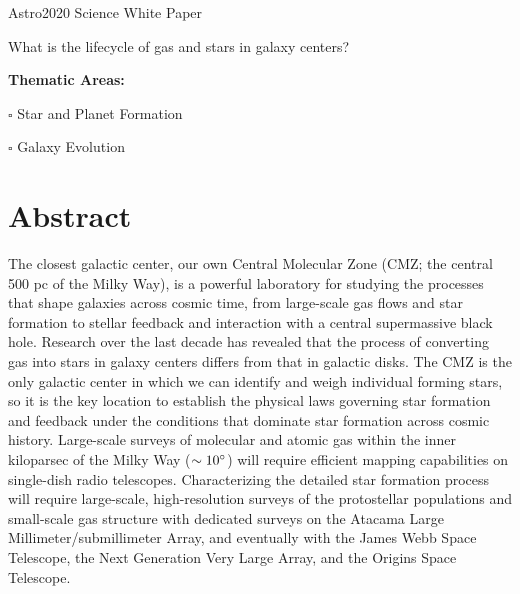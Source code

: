 \documentclass[modern]{aastex62}
\begin{document}
{\center
\huge
Astro2020 Science White Paper \linebreak

What is the lifecycle of gas and stars in galaxy centers? 
\vspace{5mm}
}

{
\noindent \textbf{Thematic Areas:}

\noindent $\square$ Star and Planet Formation 

\noindent $\square$ Galaxy Evolution  
}
% 
%  

\vspace{5mm}
\author{Adam Ginsburg}
\author{Elisabeth A.~C.~Mills}
\author{Cara D.~Battersby}
\author{Steven N.~Longmore}
\author{J.~M.~Diederik Kruijssen}


\section*{}





\section*{Abstract}
The closest galactic center, our own Central Molecular Zone (CMZ; the
central 500 pc of the Milky Way), is a powerful laboratory for studying the
processes that shape galaxies across cosmic time, from large-scale gas flows
and star formation to stellar feedback and interaction with a central
supermassive black hole. Research over the last decade has revealed that the
process of converting gas into stars in galaxy centers differs from 
that in galactic disks. The CMZ is the only galactic center in which
we can identify and weigh individual forming stars, so it is the key location
to establish the physical laws governing star formation and feedback under the
conditions that dominate star formation across cosmic history. Large-scale surveys
of molecular and atomic gas within the inner kiloparsec of the Milky Way
($\sim10^{\circ}$) will require efficient mapping capabilities on single-dish
radio telescopes. Characterizing the detailed star formation process will
require large-scale, high-resolution surveys of the protostellar populations
and small-scale gas structure with dedicated surveys on the Atacama Large
Millimeter/submillimeter Array, and eventually with the James Webb Space
Telescope, the Next Generation Very Large Array, and the Origins Space
Telescope.
\vspace{5mm}
\end{document}

